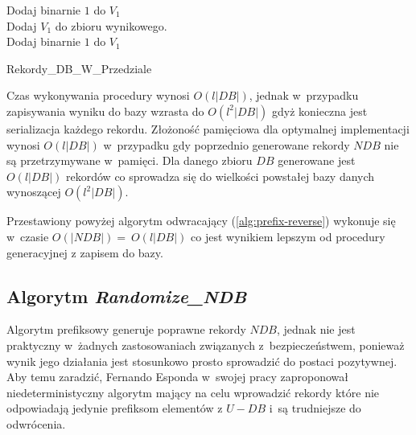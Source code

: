 \begin{algorithm}[H]
    \SetAlgoLined
    Dodaj binarnie $1$ do $V_1$\\
    {
       Dodaj $V_1$ do zbioru wynikowego. \\
       Dodaj binarnie $1$ do $V_1$\\
    }
    \caption{Rekordy\_DB\_W\_Przedziale}
    \label{alg:prefix-reverse-print}
\end{algorithm}


Czas wykonywania procedury wynosi $O(l|DB|)$, jednak w~przypadku zapisywania wyniku do bazy wzrasta do $O(l^2|DB|)$ gdyż konieczna jest serializacja każdego rekordu.
Złożoność pamięciowa dla optymalnej implementacji wynosi $O(l|DB|)$ w~przypadku gdy poprzednio generowane rekordy $NDB$ nie są przetrzymywane w~pamięci. 
Dla danego zbioru $DB$ generowane jest $O(l|DB|)$ rekordów co sprowadza się do wielkości powstałej bazy danych wynoszącej $O(l^2|DB|)$.

Przestawiony powyżej algorytm odwracający (\ref{alg:prefix-reverse}) wykonuje się w~czasie $O(|NDB|)=~O(l|DB|)$ co jest wynikiem lepszym od procedury generacyjnej z zapisem do bazy.

\subsection{Algorytm \textit{Randomize\_NDB}}
Algorytm prefiksowy generuje poprawne rekordy $NDB$, jednak nie jest praktyczny w~żadnych zastosowaniach związanych
z~bezpieczeństwem, ponieważ wynik jego działania jest stosunkowo prosto sprowadzić do postaci pozytywnej. 
Aby temu zaradzić, Fernando Esponda w~swojej pracy\cite{NRI-Esponda} zaproponował 
niedeterministyczny algorytm mający na celu wprowadzić rekordy które nie odpowiadają jedynie prefiksom elementów
z $U - DB$ i~są trudniejsze do odwrócenia.

